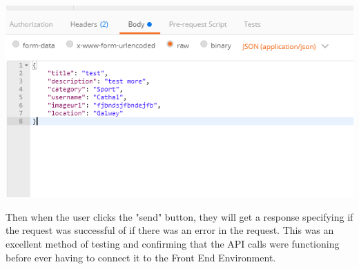 \includegraphics[scale = 0.8]{img/postman-JSON.PNG} \par
Then when the user clicks the "send" button, they will get a response specifying if the request was successful of if there was an error in the request. This was an excellent method of testing and confirming that the API calls were functioning before ever having to connect it to the Front End Environment.

